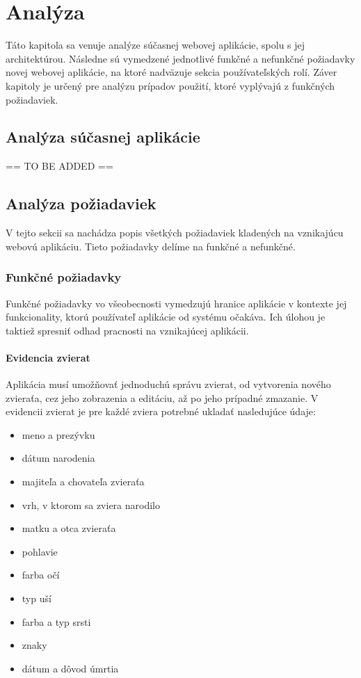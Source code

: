 \chapter{Analýza}
Táto kapitola sa venuje analýze súčasnej webovej aplikácie, spolu s jej architektúrou. Následne sú vymedzené jednotlivé funkčné a nefunkčné požiadavky novej webovej aplikácie, na ktoré nadväzuje sekcia používateľských rolí. Záver kapitoly je určený pre analýzu prípadov použití, ktoré vyplývajú z funkčných požiadaviek.

\section{Analýza súčasnej aplikácie}
== TO BE ADDED ==

\section{Analýza požiadaviek}
V tejto sekcii sa nachádza popis všetkých požiadaviek kladených na vznikajúcu webovú aplikáciu.
Tieto požiadavky delíme na funkčné a nefunkčné.

\subsection{Funkčné požiadavky}\label{funkcne-poziadavky}
Funkčné požiadavky vo všeobecnosti vymedzujú hranice aplikácie v kontexte jej funkcionality, ktorú používateľ aplikácie od systému očakáva. Ich úlohou je taktiež spresniť odhad pracnosti na vznikajúcej aplikácii.\cite{funkcne-poziadavky}

\subsubsection{Evidencia zvierat}\label{evidencia-zvierat}
Aplikácia musí umožňovať jednoduchú správu zvierat, od vytvorenia nového zvieraťa, cez jeho zobrazenia a editáciu, až po jeho prípadné zmazanie. V evidencii zvierat je pre každé zviera potrebné ukladať nasledujúce údaje:

\begin{itemize}
	\item meno a prezývku
	\item dátum narodenia
	\item majiteľa a chovateľa zvieraťa
	\item vrh, v ktorom sa zviera narodilo
	\item matku a otca zvieraťa
	\item pohlavie
	\item farba očí
	\item typ uší
	\item farba a typ srsti
	\item znaky
	\item dátum a dôvod úmrtia
\end{itemize}

